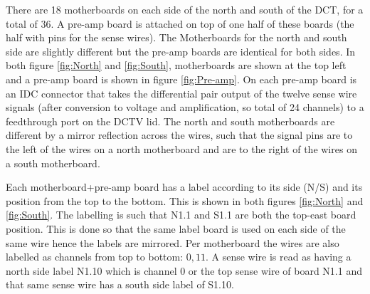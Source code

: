 \documentclass[12pt]{article}
\begin{document}
There are 18 motherboards on each side of the north and south of the DCT, for a total of 36. %
A pre-amp board is attached on top of one half of these boards (the half with pins for the sense wires). The Motherboards for the north and south side are slightly different but the pre-amp boards are identical for both sides. In both figure \ref{fig:North} and \ref{fig:South}, motherboards are shown at the top left and a pre-amp board is shown in figure \ref{fig:Pre-amp}. On each pre-amp board is an IDC connector that takes the differential pair output of the twelve sense wire signals (after conversion to voltage and amplification, so total of 24 channels) to a feedthrough port on the DCTV lid. %
The north and south motherboards are different by a mirror reflection across the wires, such that the signal pins are to the left of the wires on a north motherboard and are to the right of the wires on a south motherboard. 

Each motherboard+pre-amp board has a label according to its side (N/S) and its position from the top to the bottom. This is shown in both figures \ref{fig:North} and \ref{fig:South}. The labelling is such that N1.1 and S1.1 are both the top-east board position. This is done so that the same label board is used on each side of the same wire hence the labels are mirrored. Per motherboard the wires are also labelled as channels from top to bottom: ${0,11}$. A sense wire is read as having a north side label N1.10 which is channel 0 or the top sense wire of board N1.1 and that same sense wire has a south side label of S1.10.
\end{document}
